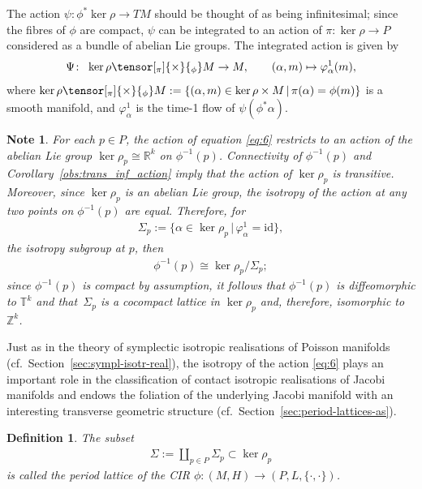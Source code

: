 \documentclass[10pt,a4paper]{amsart}
\numberwithin{equation}{section}
\newtheorem{Definition}[Theorem]{Definition}
\newtheorem{Note}[Theorem]{Note}
\newcommand{\JM}{(P,L,\{\cdot,\cdot\})} %
\newcommand{\CM}{(M,H)} %
\newcommand{\RR}{\mathbb{R}}
\newcommand{\ZZ}{\mathbb{Z}}
\begin{document}
The action $\psi \colon \phi^* \ker \rho \to T M$ should be thought of as being inf\/initesimal; since the f\/ibres of $\phi$ are compact, $\psi$ can be integrated to an action of $\pi \colon \ker \rho \to P$ considered as a bundle of abelian Lie groups. The integrated action is given by
\begin{gather}\label{eq:6}
 \Psi \colon \ \ker \rho \tensor[_\pi]{\times}{_{\phi}} M\to M, \qquad (\alpha,m) \mapsto \varphi^1_{\alpha}(m),
\end{gather}
where $ \ker \rho \tensor[_\pi]{\times}{_{\phi}} M :=\{ (\alpha,m) \in \ker \rho \times M \,|\,\pi(\alpha) = \phi(m) \}$ is a smooth manifold, and $\varphi^1_{\alpha}$ is the time-1 f\/low of $\psi(\phi^*\alpha)$.

\begin{Note}\label{obs:per_lattice} For each $p \in P$, the action of equation \eqref{eq:6} restricts to an action of the abelian Lie group $\ker \rho_{p} \cong \RR^k$ on $\phi^{-1}(p)$. Connectivity of $\phi^{-1}(p)$ and Corollary~\ref{obs:trans_inf_action} imply that the action of $\ker \rho_{p}$ is transitive. Moreover, since $\ker \rho_{p}$ is an abelian Lie group, the isotropy of the action at any two points on $\phi^{-1}(p)$ are equal. Therefore, for
\begin{gather*}
 \Sigma_p := \big\{ \alpha\in \ker \rho_{p} \,|\, \varphi^1_{\alpha} = \mathrm{id} \big\},
\end{gather*}
the isotropy subgroup at $p$, then
\begin{gather*}
 \phi^{-1}(p) \cong \ker \rho_{p}/\Sigma_p;
\end{gather*}
since $\phi^{-1}(p)$ is compact by assumption, it follows that $\phi^{-1}(p)$ is dif\/feomorphic to $\mathbb{T}^k$ and that~$\Sigma_p$ is a cocompact lattice in $\ker \rho_{p}$ and, therefore, isomorphic to $\ZZ^k$.
\end{Note}

Just as in the theory of symplectic isotropic realisations of Poisson manifolds (cf.\ Section~\ref{sec:sympl-isotr-real}), the isotropy of the action \eqref{eq:6} plays an important role in the classif\/ication of contact isotropic realisations of Jacobi manifolds and endows the foliation of the underlying Jacobi manifold with an interesting transverse geometric structure (cf.\ Section~\ref{sec:period-lattices-as}).

\begin{Definition}\label{defn:period_lattice} The subset
 \begin{gather*}
 \Sigma := \coprod\limits_{p \in P} \Sigma_p \subset \ker \rho_{p}
 \end{gather*}
is called the {\it period lattice} of the CIR $\phi \colon \CM \to \JM$.
\end{Definition}
\end{document}
